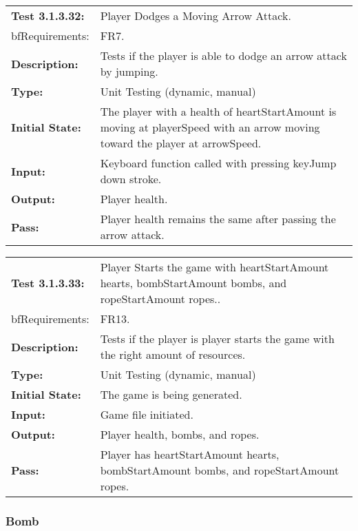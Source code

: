 \documentclass[12pt, titlepage]{article}
\begin{document}
\begin{tabular}{|l|p{10cm}|}
    \hline
    \bf{Test} 3.1.3.32: & Player Dodges a Moving Arrow Attack.\\
    bf{Requirements}: & FR7. \\
    \bf{Description}: & Tests if the player is able to dodge an arrow attack by jumping.\\
    \bf{Type}: & Unit Testing (dynamic, manual) \\
    \bf{Initial State}: & The player with a health of heartStartAmount is moving at playerSpeed with an arrow moving toward the player at arrowSpeed.\\
    \bf{Input}: & Keyboard function called with pressing keyJump down stroke.\\
    \bf{Output}: & Player health.\\
    \bf{Pass}: & Player health remains the same after passing the arrow attack.\\
    \hline
\end{tabular}

\begin{tabular}{|l|p{10cm}|}
    \hline
    \bf{Test} 3.1.3.33: & Player Starts the game with heartStartAmount hearts, bombStartAmount bombs, and ropeStartAmount ropes..\\
    bf{Requirements}: & FR13. \\
    \bf{Description}: & Tests if the player is player starts the game with the right amount of resources.\\
    \bf{Type}: & Unit Testing (dynamic, manual) \\
    \bf{Initial State}: & The game is being generated.\\
    \bf{Input}: & Game file initiated.\\
    \bf{Output}: & Player health, bombs, and ropes.\\
    \bf{Pass}: & Player has heartStartAmount hearts, bombStartAmount bombs, and ropeStartAmount ropes.\\
    \hline
\end{tabular}

\subsubsection{Bomb}
\end{document}
